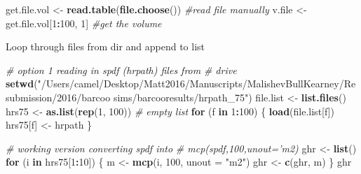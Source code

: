 \documentclass[10,portrait]{article}
\newenvironment{Shaded}{\begin{snugshade}}{\end{snugshade}}
\newcommand{\KeywordTok}[1]{\textcolor[rgb]{0.13,0.29,0.53}{\textbf{#1}}}
\newcommand{\DataTypeTok}[1]{\textcolor[rgb]{0.13,0.29,0.53}{#1}}
\newcommand{\DecValTok}[1]{\textcolor[rgb]{0.00,0.00,0.81}{#1}}
\newcommand{\StringTok}[1]{\textcolor[rgb]{0.31,0.60,0.02}{#1}}
\newcommand{\CommentTok}[1]{\textcolor[rgb]{0.56,0.35,0.01}{\textit{#1}}}
\newcommand{\ControlFlowTok}[1]{\textcolor[rgb]{0.13,0.29,0.53}{\textbf{#1}}}
\newcommand{\OperatorTok}[1]{\textcolor[rgb]{0.81,0.36,0.00}{\textbf{#1}}}
\newcommand{\NormalTok}[1]{#1}
\begin{document}
\begin{Shaded}
\begin{Highlighting}[]
\NormalTok{get.file.vol <-}\StringTok{ }\KeywordTok{read.table}\NormalTok{(}\KeywordTok{file.choose}\NormalTok{())  }\CommentTok{#read file manually}
\NormalTok{v.file <-}\StringTok{ }\NormalTok{get.file.vol[}\DecValTok{1}\OperatorTok{:}\DecValTok{100}\NormalTok{, }\DecValTok{1}\NormalTok{]  }\CommentTok{#get the volume}
\end{Highlighting}
\end{Shaded}

Loop through files from dir and append to list

\begin{Shaded}
\begin{Highlighting}[]
\CommentTok{# option 1 reading in spdf (hrpath) files from}
\CommentTok{# drive}
\KeywordTok{setwd}\NormalTok{(}\StringTok{"/Users/camel/Desktop/Matt2016/Manuscripts/MalishevBullKearney/Resubmission/2016/barcoo sims/barcooresults/hrpath_75"}\NormalTok{)}
\NormalTok{file.list <-}\StringTok{ }\KeywordTok{list.files}\NormalTok{()}
\NormalTok{hrs75 <-}\StringTok{ }\KeywordTok{as.list}\NormalTok{(}\KeywordTok{rep}\NormalTok{(}\DecValTok{1}\NormalTok{, }\DecValTok{100}\NormalTok{))  }\CommentTok{# empty list}
\ControlFlowTok{for}\NormalTok{ (f }\ControlFlowTok{in} \DecValTok{1}\OperatorTok{:}\DecValTok{100}\NormalTok{) \{}
    \KeywordTok{load}\NormalTok{(file.list[f])}
\NormalTok{    hrs75[f] <-}\StringTok{ }\NormalTok{hrpath}
\NormalTok{\}}

\CommentTok{# working version converting spdf into}
\CommentTok{# mcp(spdf,100,unout='m2)}
\NormalTok{ghr <-}\StringTok{ }\KeywordTok{list}\NormalTok{()}
\ControlFlowTok{for}\NormalTok{ (i }\ControlFlowTok{in}\NormalTok{ hrs75[}\DecValTok{1}\OperatorTok{:}\DecValTok{10}\NormalTok{]) \{}
\NormalTok{    m <-}\StringTok{ }\KeywordTok{mcp}\NormalTok{(i, }\DecValTok{100}\NormalTok{, }\DataTypeTok{unout =} \StringTok{"m2"}\NormalTok{)}
\NormalTok{    ghr <-}\StringTok{ }\KeywordTok{c}\NormalTok{(ghr, m)}
\NormalTok{\}}
\NormalTok{ghr}


\end{Highlighting}
\end{Shaded}
\end{document}
